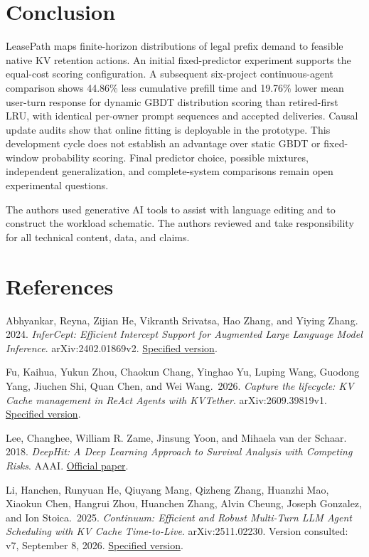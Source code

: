 \documentclass[sigconf, screen, review, balance=false]{acmart}
\begin{document}
\section{Conclusion}\label{conclusion}

LeasePath maps finite-horizon distributions of legal prefix demand to
feasible native KV retention actions. An initial fixed-predictor
experiment supports the equal-cost scoring configuration. A subsequent
six-project continuous-agent comparison shows 44.86\% less cumulative
prefill time and 19.76\% lower mean user-turn response for dynamic GBDT
distribution scoring than retired-first LRU, with identical per-owner
prompt sequences and accepted deliveries. Causal update audits show
that online fitting is deployable in the prototype. This development
cycle does not establish an advantage over static GBDT or fixed-window
probability scoring. Final predictor choice, possible mixtures,
independent generalization, and complete-system comparisons remain
open experimental questions.

\begin{acks}
The authors used generative AI tools to assist with language editing and to construct the workload schematic. The authors reviewed and take responsibility for all technical content, data, and claims.
\end{acks}

\section*{References}\label{references}
\small

Abhyankar, Reyna, Zijian He, Vikranth Srivatsa, Hao Zhang, and Yiying
Zhang. 2024. \emph{InferCept: Efficient Intercept Support for Augmented
Large Language Model Inference}. arXiv:2402.01869v2.
\href{https://arxiv.org/abs/2402.01869v2}{Specified version}.

Fu, Kaihua, Yukun Zhou, Chaokun Chang, Yinghao Yu, Luping Wang, Guodong Yang, Jiuchen Shi, Quan Chen, and Wei Wang.~2026. \emph{Capture the lifecycle: KV Cache
management in ReAct Agents with KVTether}. arXiv:2609.39819v1.
\href{https://arxiv.org/abs/2609.39819v1}{Specified version}.

Lee, Changhee, William R. Zame, Jinsung Yoon, and Mihaela van der
Schaar. 2018. \emph{DeepHit: A Deep Learning Approach to Survival
Analysis with Competing Risks}. AAAI.
\href{https://cdn.aaai.org/ojs/11842/11842-13-15370-1-2-20201228.pdf}{Official
paper}.

Li, Hanchen, Runyuan He, Qiuyang Mang, Qizheng Zhang, Huanzhi Mao, Xiaokun Chen, Hangrui Zhou, Huanchen Zhang, Alvin Cheung, Joseph Gonzalez, and Ion Stoica.~2025. \emph{Continuum: Efficient and Robust
Multi-Turn LLM Agent Scheduling with KV Cache Time-to-Live}.
arXiv:2511.02230. Version consulted: v7, September 8, 2026.
\href{https://arxiv.org/abs/2511.02230v7}{Specified version}.
\end{document}
